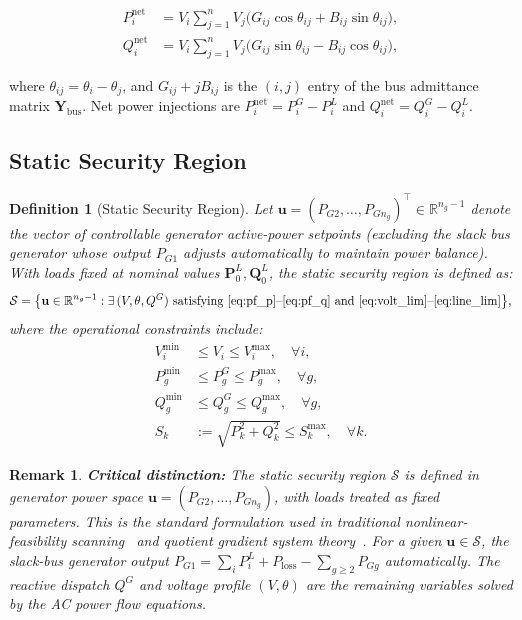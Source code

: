 \documentclass[journal]{IEEEtran}
\newtheorem{definition}{Definition}
\newtheorem{remark}{Remark}
\newcommand{\R}{\mathbb{R}}
\newcommand{\SSR}{\mathcal{S}}
\begin{document}
\begin{align}
  P_i^{\mathrm{net}} &= V_i \sum_{j=1}^{n} V_j
    \bigl(G_{ij}\cos\theta_{ij} + B_{ij}\sin\theta_{ij}\bigr), \label{eq:pf_p}\\
  Q_i^{\mathrm{net}} &= V_i \sum_{j=1}^{n} V_j
    \bigl(G_{ij}\sin\theta_{ij} - B_{ij}\cos\theta_{ij}\bigr), \label{eq:pf_q}
\end{align}

where $\theta_{ij} = \theta_i - \theta_j$, and $G_{ij} + jB_{ij}$ is the
$(i,j)$ entry of the bus admittance matrix $\mathbf{Y}_{\mathrm{bus}}$. Net
power injections are $P_i^{\mathrm{net}} = P_i^G - P_i^L$ and
$Q_i^{\mathrm{net}} = Q_i^G - Q_i^L$.

\subsection{Static Security Region}

\begin{definition}[Static Security Region]
  \label{def:ssr}
  Let $\mathbf{u} = (P_{G2},\ldots,P_{Gn_g})^\top \in \R^{n_g-1}$ denote the
  vector of controllable generator active-power setpoints (excluding the slack
  bus generator whose output $P_{G1}$ adjusts automatically to maintain power
  balance). With loads \emph{fixed} at nominal values
  $\mathbf{P}^L_0, \mathbf{Q}^L_0$, the static security region is defined as:
  \begin{equation}
    \SSR = \bigl\{\mathbf{u} \in \R^{n_g-1} :
      \exists\,(V, \theta, Q^G) \text{ satisfying }
      \eqref{eq:pf_p}\text{--}\eqref{eq:pf_q}\text{ and }
      \eqref{eq:volt_lim}\text{--}\eqref{eq:line_lim} \bigr\},
    \label{eq:ssr_def}
  \end{equation}
  where the operational constraints include:
  \begin{align}
    V_i^{\min} &\le V_i \le V_i^{\max}, \quad \forall i, \label{eq:volt_lim}\\
    P_g^{\min} &\le P_g^G \le P_g^{\max}, \quad \forall g, \label{eq:gen_p_lim}\\
    Q_g^{\min} &\le Q_g^G \le Q_g^{\max}, \quad \forall g, \label{eq:gen_q_lim}\\
    S_k &:= \sqrt{P_k^2 + Q_k^2} \le S_k^{\max}, \quad \forall k. \label{eq:line_lim}
  \end{align}
\end{definition}

\begin{remark}
  \textbf{Critical distinction:} The static security region $\SSR$ is defined
  in \emph{generator power space} $\mathbf{u} = (P_{G2},\ldots,P_{Gn_g})$,
  with loads treated as \emph{fixed parameters}. This is the standard
  formulation used in traditional nonlinear-feasibility scanning~\cite{bukhsh2013local} and
  quotient gradient system theory~\cite{jiang2017feasibility}. For a given
  $\mathbf{u} \in \SSR$, the slack-bus generator output
  $P_{G1} = \sum_i P_i^L + P_{\mathrm{loss}} - \sum_{g \ge 2} P_{Gg}$
  automatically. The reactive dispatch $Q^G$ and voltage profile $(V,\theta)$
  are the remaining variables solved by the AC power flow equations.
\end{remark}
\end{document}
